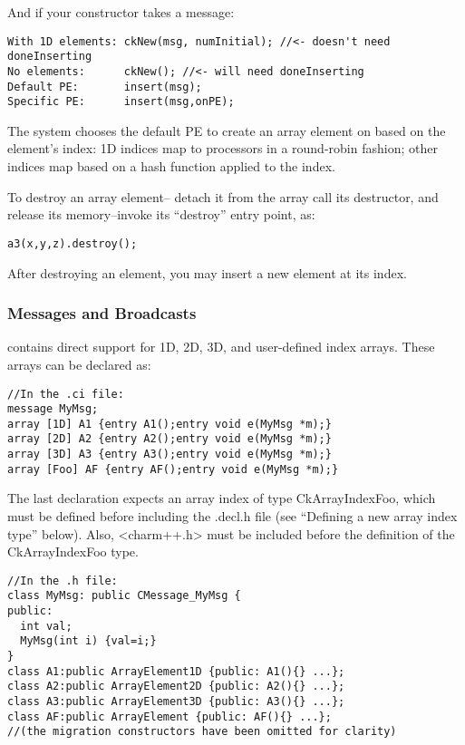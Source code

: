 And if your constructor takes a message:
\begin{verbatim}
With 1D elements: ckNew(msg, numInitial); //<- doesn't need doneInserting
No elements:      ckNew(); //<- will need doneInserting
Default PE:       insert(msg);
Specific PE:      insert(msg,onPE);
\end{verbatim}

The system chooses the default PE to create an array element on
based on the element's index: 1D indices map to processors in
a round-robin fashion; other indices map based on a hash function
applied to the index.

To destroy an array element-- detach it from the array
call its destructor, and release its memory--invoke its ``destroy'' 
entry point, as:
\begin{verbatim}
a3(x,y,z).destroy();
\end{verbatim}

After destroying an element, you may insert a new element at
its index.


\subsubsection{Messages and Broadcasts}

\charmpp contains direct support for 1D, 2D, 3D, and user-defined
index arrays.  These arrays can be declared as:

\begin{verbatim}
//In the .ci file:
message MyMsg;
array [1D] A1 {entry A1();entry void e(MyMsg *m);}
array [2D] A2 {entry A2();entry void e(MyMsg *m);}
array [3D] A3 {entry A3();entry void e(MyMsg *m);}
array [Foo] AF {entry AF();entry void e(MyMsg *m);}
\end{verbatim}

The last declaration expects an array index of type CkArrayIndexFoo,
which must be defined before including the .decl.h file 
(see ``Defining a new array index type'' below).  Also, <charm++.h> must be included before the definition of the CkArrayIndexFoo type. 

\begin{verbatim}
//In the .h file:
class MyMsg: public CMessage_MyMsg {
public: 
  int val;
  MyMsg(int i) {val=i;}
}
class A1:public ArrayElement1D {public: A1(){} ...};
class A2:public ArrayElement2D {public: A2(){} ...};
class A3:public ArrayElement3D {public: A3(){} ...};
class AF:public ArrayElement {public: AF(){} ...};
//(the migration constructors have been omitted for clarity)
\end{verbatim}

